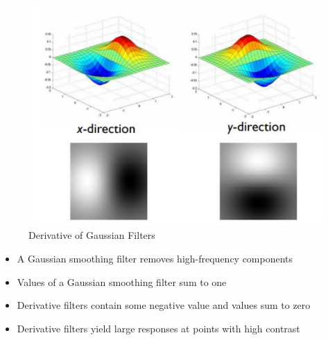 \documentclass[11pt]{article}
\begin{document}
\begin{figure}[H]
	\centering
	\includegraphics[width=0.6\linewidth]{img/derivative_gaussian_filter2}
	\caption{Derivative of Gaussian Filters}
	\label{fig:derivativegaussianfilter2}
\end{figure}

\begin{itemize}
	\item A Gaussian smoothing filter removes high-frequency components
	\item Values of a Gaussian smoothing filter sum to one
	\item Derivative filters contain some negative value and values sum to zero
	\item Derivative filters yield large responses at points with high contrast
\end{itemize}


\end{document}
